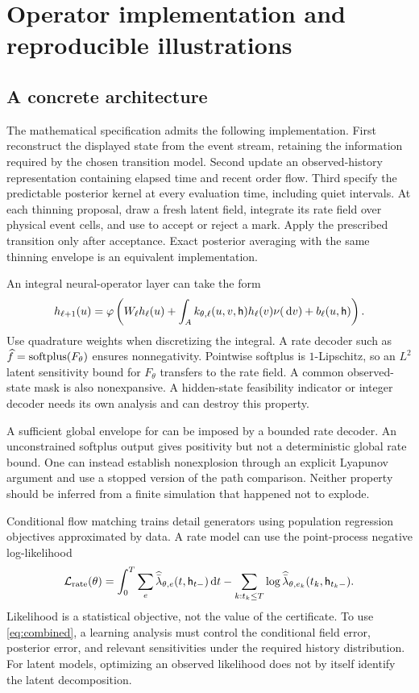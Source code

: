 \section{Operator implementation and reproducible illustrations}\label{sec:numerics}
\subsection{A concrete architecture}
The mathematical specification admits the following implementation. First reconstruct the displayed state from the event stream, retaining the information required by the chosen transition model. Second update an observed-history representation containing elapsed time and recent order flow. Third specify the predictable posterior kernel at every evaluation time, including quiet intervals. At each thinning proposal, draw a fresh latent field, integrate its rate field over physical event cells, and use  to accept or reject a mark. Apply the prescribed transition only after acceptance. Exact posterior averaging with the same thinning envelope is an equivalent implementation.

An integral neural-operator layer can take the form
\begin{equation}\label{eq:layer}
 h_{\ell+1}(u)=\varphi\left(
 W_\ell h_\ell(u)+
 \int_A k_{\theta,\ell}(u,v,\mathsf h)h_\ell(v)\nu(\,\mathrm d v)
 +b_\ell(u,\mathsf h)\right).
\end{equation}
Use quadrature weights when discretizing the integral. A rate decoder such as
$\widehat f=\operatorname{softplus}(F_\theta)$ ensures nonnegativity. Pointwise softplus is $1$-Lipschitz, so an $L^2$ latent sensitivity bound for $F_\theta$ transfers to the rate field. A common observed-state mask is also nonexpansive. A hidden-state feasibility indicator or integer decoder needs its own analysis and can destroy this property.

A sufficient global envelope for  can be imposed by a bounded rate decoder. An unconstrained softplus output gives positivity but not a deterministic global rate bound. One can instead establish nonexplosion through an explicit Lyapunov argument and use a stopped version of the path comparison. Neither property should be inferred from a finite simulation that happened not to explode.

Conditional flow matching trains detail generators using population regression objectives approximated by data. A rate model can use the point-process negative log-likelihood
\begin{equation}\label{eq:likelihood}
 \mathcal L_{\rm rate}(\theta)
 =\int_0^T\sum_e\widehat{\bar\lambda}_{\theta,e}(t,\mathsf h_{t-})\,\mathrm d t
 -\sum_{k:t_k\le T}\log
   \widehat{\bar\lambda}_{\theta,e_k}(t_k,\mathsf h_{t_k-}).
\end{equation}
Likelihood is a statistical objective, not the value of the certificate. To use \eqref{eq:combined}, a learning analysis must control the conditional field error, posterior error, and relevant sensitivities under the required history distribution. For latent models, optimizing an observed likelihood does not by itself identify the latent decomposition.

